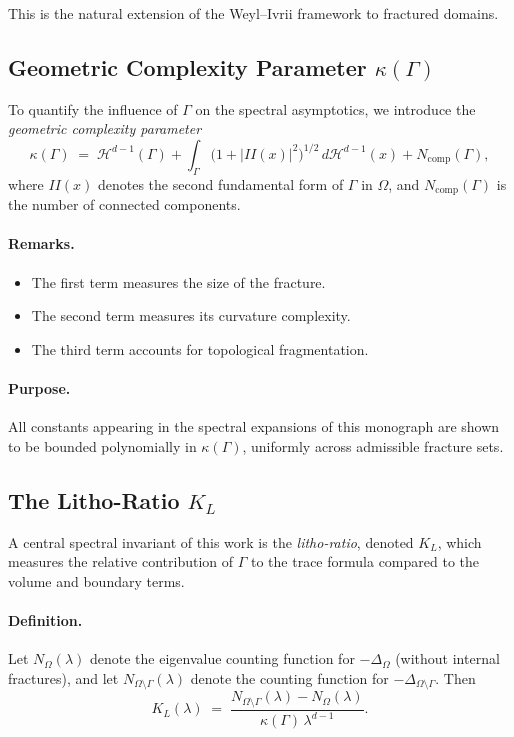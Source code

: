 This is the natural extension of the Weyl--Ivrii framework to fractured
domains.

\subsection{Geometric Complexity Parameter $\kappa(\Gamma)$}

To quantify the influence of $\Gamma$ on the spectral asymptotics, we introduce
the \emph{geometric complexity parameter}
\[
\kappa(\Gamma) \;=\;
\mathcal{H}^{d-1}(\Gamma)
+ \int_\Gamma \bigl(1+|II(x)|^2\bigr)^{1/2}\, d\mathcal{H}^{d-1}(x)
+ N_{\mathrm{comp}}(\Gamma),
\]
where $II(x)$ denotes the second fundamental form of $\Gamma$ in $\Omega$, and
$N_{\mathrm{comp}}(\Gamma)$ is the number of connected components.

\paragraph{Remarks.}
\begin{itemize}
  \item The first term measures the size of the fracture.
  \item The second term measures its curvature complexity.
  \item The third term accounts for topological fragmentation.
\end{itemize}

\paragraph{Purpose.}
All constants appearing in the spectral expansions of this monograph are shown
to be bounded polynomially in $\kappa(\Gamma)$, uniformly across admissible
fracture sets.

\subsection{The Litho-Ratio $K_L$}

A central spectral invariant of this work is the \emph{litho-ratio},
denoted $K_L$, which measures the relative contribution of $\Gamma$ to the trace
formula compared to the volume and boundary terms.

\paragraph{Definition.}
Let $N_\Omega(\lambda)$ denote the eigenvalue counting function for
$-\Delta_\Omega$ (without internal fractures), and
let $N_{\Omega\setminus\Gamma}(\lambda)$ denote the counting function for
$-\Delta_{\Omega\setminus\Gamma}$. Then
\[
K_L(\lambda) \;=\;
\frac{N_{\Omega\setminus\Gamma}(\lambda) - N_\Omega(\lambda)}
{\kappa(\Gamma)\,\lambda^{d-1}}.
\]

